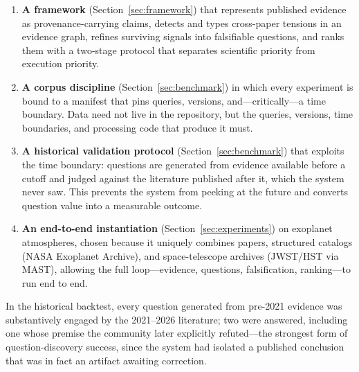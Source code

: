 \begin{enumerate}
  \item \textbf{A framework} (Section~\ref{sec:framework}) that
    represents published evidence as provenance-carrying claims, detects
    and types cross-paper tensions in an evidence graph, refines
    surviving signals into falsifiable questions, and ranks them with a
    two-stage protocol that separates scientific priority from execution
    priority.
  \item \textbf{A corpus discipline} (Section~\ref{sec:benchmark}) in
    which every experiment is bound to a manifest that pins queries,
    versions, and---critically---a time boundary. Data need not live in
    the repository, but the queries, versions, time boundaries, and
    processing code that produce it must.
  \item \textbf{A historical validation protocol}
    (Section~\ref{sec:benchmark}) that exploits the time boundary:
    questions are generated from evidence available before a cutoff and
    judged against the literature published after it, which the system
    never saw. This prevents the system from peeking at the future and
    converts question value into a measurable outcome.
  \item \textbf{An end-to-end instantiation}
    (Section~\ref{sec:experiments}) on exoplanet atmospheres, chosen
    because it uniquely combines papers, structured catalogs (NASA
    Exoplanet Archive), and space-telescope archives (JWST/HST via
    MAST), allowing the full loop---evidence, questions, falsification,
    ranking---to run end to end.
\end{enumerate}

In the historical backtest, every question generated from
pre-2021 evidence was substantively engaged by the 2021--2026 literature;
two were answered, including one whose premise the community later
explicitly refuted---the strongest form of question-discovery success,
since the system had isolated a published conclusion that was in fact an
artifact awaiting correction.
